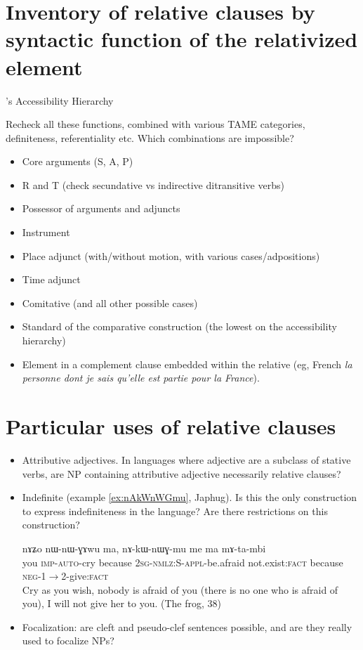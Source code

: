 \documentclass[oneside,a4paper,11pt]{article}
\newcommand{\ipa}[1]{{\phon #1}} %
\begin{document}
 \section{Inventory of relative clauses by syntactic function of the relativized element} \label{sec:inventory}
\citet{keenan77accessibility}'s Accessibility Hierarchy

Recheck all these functions, combined with various TAME categories, definiteness, referentiality etc. Which combinations are impossible?

\begin{itemize}
\item Core arguments (S, A, P)
\item R and T (check secundative vs indirective ditransitive verbs)
\item Possessor of arguments and adjuncts
\item Instrument
\item Place adjunct (with/without motion, with various cases/adpositions)
\item Time adjunct
\item Comitative (and all other possible cases)
\item Standard of the comparative construction (the lowest on the accessibility hierarchy)
\item Element in a complement clause embedded within the relative (eg, French \textit{la personne dont je sais qu'elle est partie pour la France}).

\end{itemize}


\section{Particular uses of relative clauses}
\begin{itemize}
\item Attributive adjectives. In languages where adjective are a subclass of stative verbs, are NP containing attributive adjective necessarily relative clauses?
\item Indefinite (example \ref{ex:nAkWnWGmu}, Japhug). Is this the only construction to express indefiniteness in the language? Are there restrictions on this construction?

\begin{exe}
   \ex  \label{ex:nAkWnWGmu}
\gll   
\ipa{nɤʑo}  	\ipa{nɯ-nɯ-ɣɤwu}  	\ipa{ma,}  	\ipa{nɤ-kɯ-nɯɣ-mu}  	\ipa{me}  	\ipa{ma}  	\ipa{mɤ-ta-mbi}  \\
you \textsc{imp-auto}-cry because \textsc{2sg-nmlz:S-appl}-be.afraid not.exist:\textsc{fact} because \textsc{neg-1$\rightarrow$2-}give:\textsc{fact} \\
\glt Cry as you wish, nobody is afraid of you (there is no one who is afraid of you), I will not give her to you.  (The frog, 38)
\end{exe}
\item Focalization: are cleft and  pseudo-clef sentences possible, and are they really used to focalize NPs?
\end{itemize}
\end{document}
